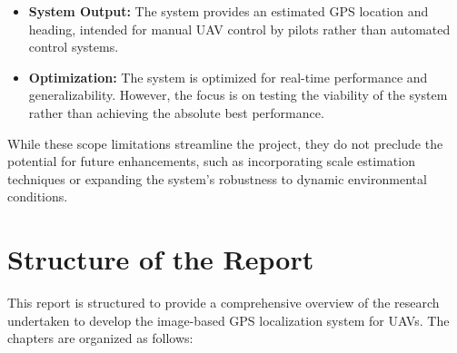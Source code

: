 \begin{itemize}
    \item \textbf{System Output:} The system provides an estimated GPS location and heading, intended for manual UAV control by pilots rather than automated control systems.
    
    \item \textbf{Optimization:} The system is optimized for real-time performance and generalizability. However, the focus is on testing the viability of the system rather than achieving the absolute best performance.
    
\end{itemize}

While these scope limitations streamline the project, they do not preclude the potential for future enhancements, such as incorporating scale estimation techniques or expanding the system's robustness to dynamic environmental conditions.

\section{Structure of the Report}
This report is structured to provide a comprehensive overview of the research undertaken to develop the image-based GPS localization system for UAVs. The chapters are organized as follows:

